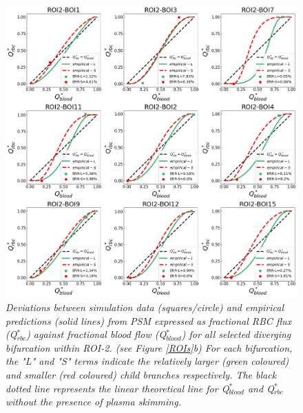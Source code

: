 \useportrait
\begin{figure}[H]
\centering
\includegraphics[width=1\textwidth]{images/DisproportionalityIndexQblood-ROI2.png}
\caption{\textit{Deviations between simulation data (squares/circle) and empirical predictions (solid lines) from PSM expressed as fractional RBC flux (Q$^{*}_{rbc}$) against fractional blood flow (Q$^{*}_{blood}$) for all selected diverging bifurcation within ROI-2. (see Figure \ref{ROIs}b) For each bifurcation, the "L" and "S" terms indicate the relatively larger (green coloured) and smaller (red coloured) child branches respectively. The black dotted line represents the linear theoretical line for Q$^{*}_{blood}$ and Q$^{*}_{rbc}$ without the presence of plasma skimming.} \label{DisproportionalityIndexQblood-ROI2}}
\end{figure}


